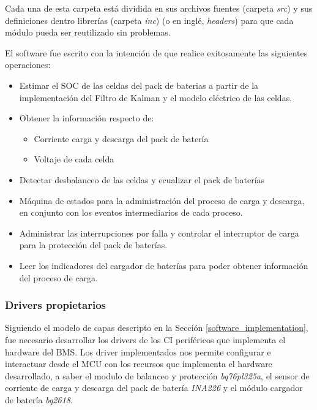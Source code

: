 \documentclass[10pt, a4paper]{article}
\begin{document}
\newpage

Cada una de esta carpeta est\'a dividida en sus archivos fuentes (carpeta
\emph{src}) y sus definiciones dentro librer\'ias (carpeta \emph{inc}) 
(o en ingl\'e, \emph{headers}) para que cada m\'odulo pueda ser reutilizado sin 
problemas.

El software fue escrito con la intención de que realice exitosamente las
siguientes operaciones: 

\begin{itemize}
    \item Estimar el \acrshort{SOC} de las celdas del pack de baterias a partir
        de la implementación del Filtro de Kalman y el modelo eléctrico de las
        celdas. 
    \item Obtener la información respecto de: 
        \begin{itemize}
            \item Corriente carga y descarga del pack de batería
            \item Voltaje de cada celda
        \end{itemize}
    \item Detectar desbalanceo de las celdas y ecualizar el pack de baterías
    \item M\'aquina de estados para la administraci\'on del proceso de carga y
        descarga, en conjunto con los eventos intermediarios de cada proceso.
    \item Administrar las interrupciones por falla y controlar el interruptor de
        carga para la protecci\'on del pack de bater\'ias.
    \item Leer los indicadores del cargador de bater\'ias para poder obtener
        informaci\'on del proceso de carga.
\end{itemize}

\subsubsection{Drivers propietarios}

Siguiendo el modelo de capas descripto en la Sección 
\ref{software_implementation}, fue necesario desarrollar los drivers de los
\acrshort{CI} periféricos que implementa el hardware del \acrshort{BMS}. Los
driver implementados nos permite configurar e interactuar desde el
\acrshort{MCU} con los recursos que implementa el hardware desarrollado, a saber
el modulo de balanceo y protección \emph{bq76pl325a}, el sensor de corriente de
carga y descarga del pack de batería \emph{INA226} y el módulo cargador de
batería \emph{bq2618}.
\end{document}
